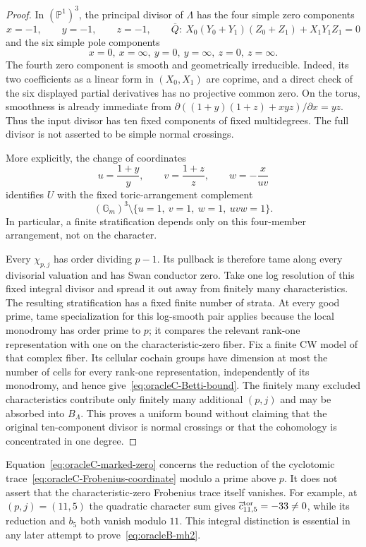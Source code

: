 \begin{proof}
In $(\mathbb P^1)^3$, the principal divisor of $\Lambda$ has the four
simple zero components
\[
 x=-1,\qquad y=-1,\qquad z=-1,\qquad
 \overline Q:\
 X_0(Y_0+Y_1)(Z_0+Z_1)+X_1Y_1Z_1=0
\]
and the six simple pole components
\[
 x=0,\ x=\infty,\ y=0,\ y=\infty,\ z=0,\ z=\infty.
\]
The fourth zero component is smooth and geometrically irreducible.  Indeed,
its two coefficients as a linear form in $(X_0,X_1)$ are coprime, and a
direct check of the six displayed partial derivatives has no projective
common zero.  On the torus, smoothness is already immediate from
$\partial((1+y)(1+z)+xyz)/\partial x=yz$.
Thus the input divisor has ten fixed components of fixed multidegrees.
The full divisor is not asserted to be simple normal crossings.

More explicitly, the change of coordinates
\[
 u=\frac{1+y}{y},\qquad v=\frac{1+z}{z},\qquad
 w=-\frac{x}{uv}
\]
identifies $U$ with the fixed toric-arrangement complement
\[
 (\mathbb G_m)^3\setminus
 \{u=1,\ v=1,\ w=1,\ uvw=1\}.
\]
In particular, a finite stratification depends only on this four-member
arrangement, not on the character.

Every $\chi_{p,j}$ has order dividing $p-1$.  Its pullback is therefore
tame along every divisorial valuation and has Swan conductor zero.  Take
one log resolution of this fixed integral divisor and spread it out away
from finitely many characteristics.  The resulting stratification has a
fixed finite number of strata.  At every good prime, tame specialization
for this log-smooth pair applies because the local monodromy has order
prime to $p$; it compares the relevant rank-one representation with one on
the characteristic-zero fiber.  Fix a finite CW model of that complex
fiber.  Its cellular cochain groups have dimension at most the number of
cells for every rank-one representation, independently of its monodromy,
and hence give~\eqref{eq:oracleC-Betti-bound}.
The finitely many excluded characteristics contribute only finitely many
additional $(p,j)$ and may be absorbed into $B_\Lambda$.  This proves a
uniform bound without claiming that the original ten-component divisor is
normal crossings or that the cohomology is concentrated in one degree.
\end{proof}

\begin{remark}
\label{rem:oracleC-integral-warning}
Equation~\eqref{eq:oracleC-marked-zero} concerns the reduction of the
cyclotomic trace~\eqref{eq:oracleC-Frobenius-coordinate} modulo a prime
above $p$.  It does not assert that the characteristic-zero Frobenius
trace itself vanishes.  For example, at $(p,j)=(11,5)$ the quadratic
character sum gives $\widetilde c_{11,5}^{\rm tor}=-33\ne0$, while its
reduction and $b_5$ both vanish modulo $11$.  This integral distinction is
essential in any later attempt to prove~\eqref{eq:oracleB-mh2}.
\end{remark}

